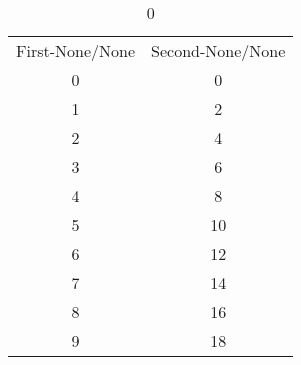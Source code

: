\begin{table}
	\caption{0}
	\label{tab:test_big}
	\begin{tabular}{cc}
		First-None/None	&	Second-None/None	\\
		0	&	0	\\
		1	&	2	\\
		2	&	4	\\
		3	&	6	\\
		4	&	8	\\
		5	&	10	\\
		6	&	12	\\
		7	&	14	\\
		8	&	16	\\
		9	&	18	\\
	\end{tabular}
\end{table}
